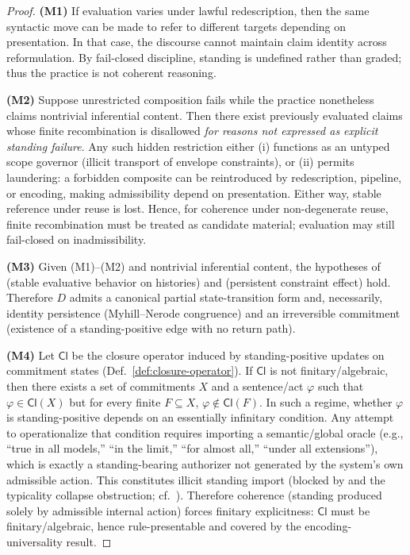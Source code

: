 \documentclass[11pt]{article}
\theoremstyle{definition}
\begin{document}
\begin{proof}
\textbf{(M1)} If evaluation varies under lawful redescription, then the same syntactic move can be made to refer to different targets depending on presentation. In that case, the discourse cannot maintain claim identity across reformulation. By fail-closed discipline, standing is undefined rather than graded; thus the practice is not coherent reasoning.

\textbf{(M2)} Suppose unrestricted composition fails while the practice nonetheless claims nontrivial inferential content.
Then there exist previously evaluated claims whose finite recombination is disallowed \emph{for reasons not expressed as explicit standing failure}. Any such hidden restriction either (i) functions as an untyped scope governor (illicit transport of envelope constraints), or (ii) permits laundering: a forbidden composite can be reintroduced by redescription, pipeline, or encoding, making admissibility depend on presentation. Either way, stable reference under reuse is lost. Hence, for coherence under non-degenerate reuse, finite recombination must be treated as candidate material; evaluation may still fail-closed on inadmissibility.

\textbf{(M3)} Given (M1)--(M2) and nontrivial inferential content, the hypotheses of  (stable evaluative behavior on histories) and  (persistent constraint effect) hold. Therefore $D$ admits a canonical partial state-transition form and, necessarily, identity persistence (Myhill--Nerode congruence) and an irreversible commitment (existence of a standing-positive edge with no return path).

\textbf{(M4)} Let $\mathsf{Cl}$ be the closure operator induced by standing-positive updates on commitment states (Def.~\ref{def:closure-operator}).
If $\mathsf{Cl}$ is not finitary/algebraic, then there exists a set of commitments $X$ and a sentence/act $\varphi$ such that $\varphi\in\mathsf{Cl}(X)$ but for every finite $F\subseteq X$, $\varphi\notin\mathsf{Cl}(F)$. In such a regime, whether $\varphi$ is standing-positive depends on an essentially infinitary condition.
Any attempt to operationalize that condition requires importing a semantic/global oracle (e.g., ``true in all models,'' ``in the limit,'' ``for almost all,'' ``under all extensions''), which is exactly a standing-bearing authorizer not generated by the system's own admissible action.
This constitutes illicit standing import (blocked by  and the typicality collapse obstruction; cf.~).
Therefore coherence (standing produced solely by admissible internal action) forces finitary explicitness: $\mathsf{Cl}$ must be finitary/algebraic, hence rule-presentable and covered by the encoding-universality result.
\end{proof}
\end{document}
